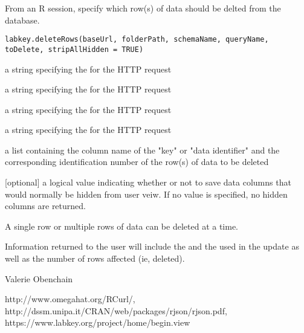 \documentclass{article}
\begin{document}
\begin{Description}\relax
From an R session, specify which row(s) of data should be delted from the database.
\end{Description}
\begin{Usage}
\begin{verbatim}
labkey.deleteRows(baseUrl, folderPath, schemaName, queryName, toDelete, stripAllHidden = TRUE)
\end{verbatim}
\end{Usage}
\begin{Arguments}
\begin{ldescription}
\item[\code{baseUrl}] a string specifying the for the HTTP request
\item[\code{folderPath}] a string specifying the  for the HTTP request
\item[\code{schemaName}] a string specifying the   for the HTTP request
\item[\code{queryName}] a string specifying the   for the HTTP request
\item[\code{toDelete}] a list containing the column name of the "key" or "data identifier" and the 
corresponding identification number of the row(s) of data to be deleted
\item[\code{stripAllHidden}] [optional] a logical value indicating whether or not to save data columns that would 
normally be hidden from user veiw. If no value is specified, no hidden columns are returned.
\end{ldescription}
\end{Arguments}
\begin{Details}\relax
A single row or multiple rows of data can be deleted at a time.
\end{Details}
\begin{Value}
Information returned to the user will include the  and the  used in the update
as well as the number of rows affected (ie, deleted).
\end{Value}
\begin{Author}\relax
Valerie Obenchain
\end{Author}
\begin{References}\relax
http://www.omegahat.org/RCurl/, 
http://dssm.unipa.it/CRAN/web/packages/rjson/rjson.pdf,
https://www.labkey.org/project/home/begin.view
\end{References}
\begin{SeeAlso}\relax
{}
\end{SeeAlso}
\end{document}
